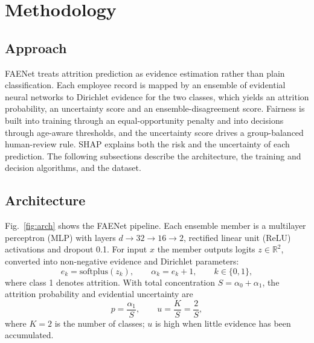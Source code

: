 \documentclass[conference]{IEEEtran}
\begin{document}
\section{Methodology}
\subsection{Approach}
FAENet treats attrition prediction as evidence estimation rather than plain classification. Each employee record is mapped by an ensemble of evidential neural networks to Dirichlet evidence for the two classes, which yields an attrition probability, an uncertainty score and an ensemble-disagreement score. Fairness is built into training through an equal-opportunity penalty and into decisions through age-aware thresholds, and the uncertainty score drives a group-balanced human-review rule. SHAP explains both the risk and the uncertainty of each prediction. The following subsections describe the architecture, the training and decision algorithms, and the dataset.

\subsection{Architecture}
Fig.~\ref{fig:arch} shows the FAENet pipeline. Each ensemble member is a multilayer perceptron (MLP) with layers $d\rightarrow32\rightarrow16\rightarrow2$, rectified linear unit (ReLU) activations and dropout 0.1. For input $x$ the member outputs logits $z\in\mathbb{R}^2$, converted into non-negative evidence and Dirichlet parameters:
\begin{equation}
e_k=\mathrm{softplus}(z_k),\qquad \alpha_k=e_k+1,\qquad k\in\{0,1\},
\end{equation}
where class 1 denotes attrition. With total concentration $S=\alpha_0+\alpha_1$, the attrition probability and evidential uncertainty are
\begin{equation}
p=\frac{\alpha_1}{S},\qquad u=\frac{K}{S}=\frac{2}{S},
\end{equation}
where $K=2$ is the number of classes; $u$ is high when little evidence has been accumulated.
\end{document}

